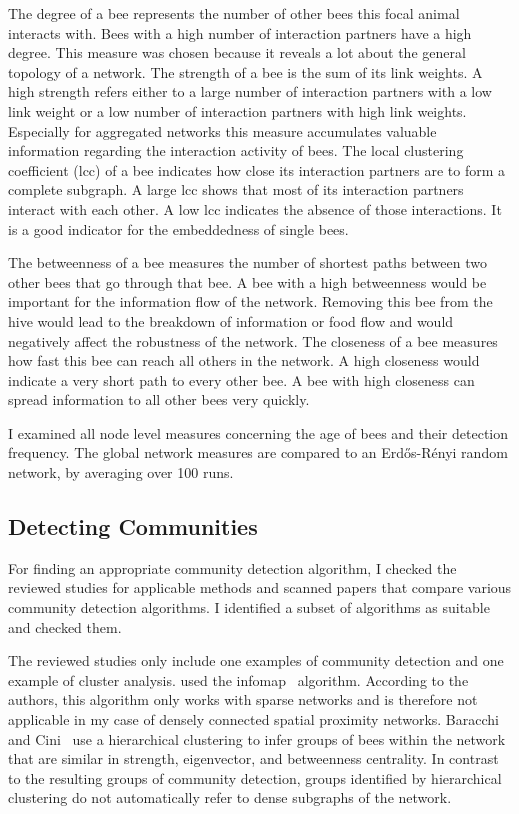 The degree of a bee represents the number of other bees this focal animal interacts with.
Bees with a high number of interaction partners have a high degree.
This measure was chosen because it reveals a lot about the general topology of a network.
The strength of a bee is the sum of its link weights.
A high strength refers either to a large number of interaction partners with a low link weight or a low number of interaction partners with high link weights.
Especially for aggregated networks this measure accumulates valuable information regarding the interaction activity of bees.
The local clustering coefficient (lcc) of a bee indicates how close its interaction partners are to form a complete subgraph.
A large lcc shows that most of its interaction partners interact with each other.
A low lcc indicates the absence of those interactions.
It is a good indicator for the embeddedness of single bees.

The betweenness of a bee measures the number of shortest paths between two other bees that go through that bee.
A bee with a high betweenness would be important for the information flow of the network.
Removing this bee from the hive would lead to the breakdown of information or food flow and would negatively affect the robustness of the network.
The closeness of a bee measures how fast this bee can reach all others in the network.
A high closeness would indicate a very short path to every other bee.
A bee with high closeness can spread information to all other bees very quickly.

I examined all node level measures concerning the age of bees and their detection frequency. The global network measures are compared to an Erd\H{o}s-R\'{e}nyi random network, by averaging over 100 runs.



\subsection{Detecting Communities}
\label{subsec:APcommunityDet}
For finding an appropriate community detection algorithm, I checked the reviewed studies for applicable methods and scanned papers that compare various community detection algorithms.
I identified a subset of algorithms as suitable and checked them.

The reviewed studies only include one examples of community detection and one example of cluster analysis. \textcite{mersch2013tracking} used the infomap~\cite{rosvall2009map,rosvall2007information} algorithm.
According to the authors, this algorithm only works with sparse networks and is therefore not applicable in my case of densely connected spatial proximity networks.
Baracchi and Cini~\cite{baracchi2014socio} use a hierarchical clustering to infer groups of bees within the network that are similar in strength, eigenvector, and betweenness centrality.
In contrast to the resulting groups of community detection, groups identified by hierarchical clustering do not automatically refer to dense subgraphs of the network.

